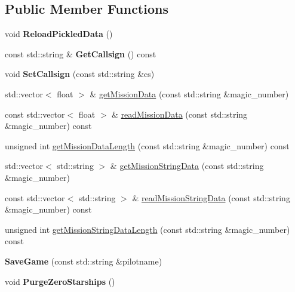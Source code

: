 \subsection*{Public Member Functions}
\begin{DoxyCompactItemize}
\item 
void {\bfseries Reload\+Pickled\+Data} ()\hypertarget{classSaveGame_ae4003bee8b361d9150968a25b24aa05c}{}\label{classSaveGame_ae4003bee8b361d9150968a25b24aa05c}

\item 
const std\+::string \& {\bfseries Get\+Callsign} () const \hypertarget{classSaveGame_a2c833649cad2f19e29434bfc03aa7c88}{}\label{classSaveGame_a2c833649cad2f19e29434bfc03aa7c88}

\item 
void {\bfseries Set\+Callsign} (const std\+::string \&cs)\hypertarget{classSaveGame_a3e1edbe7c958c0c333890f61471b6996}{}\label{classSaveGame_a3e1edbe7c958c0c333890f61471b6996}

\item 
std\+::vector$<$ float $>$ \& \hyperlink{classSaveGame_af37f324d09076344423572e357b8967f}{get\+Mission\+Data} (const std\+::string \&magic\+\_\+number)
\item 
const std\+::vector$<$ float $>$ \& \hyperlink{classSaveGame_ae16635250505b442290ef18aaf2556e8}{read\+Mission\+Data} (const std\+::string \&magic\+\_\+number) const 
\item 
unsigned int \hyperlink{classSaveGame_a9f81577bee7b100ee8be37698dbb7b8c}{get\+Mission\+Data\+Length} (const std\+::string \&magic\+\_\+number) const 
\item 
std\+::vector$<$ std\+::string $>$ \& \hyperlink{classSaveGame_a1a00f371a42477dac2aaf4ac88b53d71}{get\+Mission\+String\+Data} (const std\+::string \&magic\+\_\+number)
\item 
const std\+::vector$<$ std\+::string $>$ \& \hyperlink{classSaveGame_a06413bbcdb105df3278d0e2ca41c5299}{read\+Mission\+String\+Data} (const std\+::string \&magic\+\_\+number) const 
\item 
unsigned int \hyperlink{classSaveGame_aa1bf6a0d6a7bea5194b4a3e5cf03ffa4}{get\+Mission\+String\+Data\+Length} (const std\+::string \&magic\+\_\+number) const 
\item 
{\bfseries Save\+Game} (const std\+::string \&pilotname)\hypertarget{classSaveGame_a6a5a5282899649517d2091f4a679aabc}{}\label{classSaveGame_a6a5a5282899649517d2091f4a679aabc}

\item 
void {\bfseries Purge\+Zero\+Starships} ()\hypertarget{classSaveGame_a0e2dfa3edfb6256fa2697aa25bac498c}{}\label{classSaveGame_a0e2dfa3edfb6256fa2697aa25bac498c}


\end{DoxyCompactItemize}
